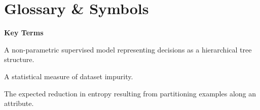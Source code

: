 \documentclass[a4paper,11pt]{article}
\begin{document}
\section*{Glossary \& Symbols}
\noindent\textbf{Key Terms}
\begin{description}[leftmargin=8.5em,style=nextline,font=\normalfont\bfseries\color{navy}]
  \item[Decision Tree] A non-parametric supervised model representing decisions as a hierarchical tree structure.
  \item[Entropy] A statistical measure of dataset impurity.
  \item[Information Gain] The expected reduction in entropy resulting from partitioning examples along an attribute.
\end{description}
\end{document}
